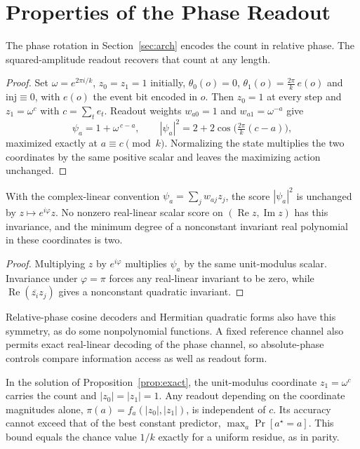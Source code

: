 \section{Properties of the Phase Readout}
\label{app:proofs}
The phase rotation in Section~\ref{sec:arch} encodes the count in relative
phase. The squared-amplitude readout recovers that count at any length.

\begin{proof}
Set $\omega = e^{2\pi i/k}$, $z_0=z_1=1$ initially, $\theta_0(o)=0$,
$\theta_1(o)=\tfrac{2\pi}{k}\,e(o)$ and $\mathrm{inj}\equiv 0$, with $e(o)$ the
event bit encoded in $o$. Then $z_0=1$ at every step and $z_1=\omega^{c}$ with
$c=\sum_t e_t$. Readout weights $w_{a0}=1$ and $w_{a1}=\omega^{-a}$ give
\begin{equation}
\psi_a = 1 + \omega^{\,c-a},\qquad
|\psi_a|^2 = 2 + 2\cos\!\Big(\tfrac{2\pi}{k}(c-a)\Big),
\label{eq:interference}
\end{equation}
maximized exactly at $a\equiv c \pmod{k}$. Normalizing the state multiplies the
two coordinates by the same positive scalar and leaves the maximizing action
unchanged.
\end{proof}


\begin{proposition}
\label{prop:gauge}
With the complex-linear convention $\psi_a=\sum_jw_{aj}z_j$, the score
$|\psi_a|^2$ is unchanged by $z\mapsto e^{i\varphi}z$.
No nonzero real-linear scalar score on $(\operatorname{Re}z,\operatorname{Im}z)$ has this
invariance, and the minimum degree of a nonconstant invariant real polynomial in these
coordinates is two.
\end{proposition}
\begin{proof}
Multiplying $z$ by $e^{i\varphi}$ multiplies $\psi_a$ by the same unit-modulus scalar.
Invariance under $\varphi=\pi$ forces any real-linear invariant to be zero, while
$\operatorname{Re}(\overline{z_i}z_j)$ gives a nonconstant quadratic invariant.
\end{proof}
Relative-phase cosine decoders and Hermitian quadratic forms also have this
symmetry, as do some nonpolynomial functions.
A fixed reference channel also permits exact real-linear decoding of the phase channel,
so absolute-phase controls compare information access as well as readout form.

\begin{lemma}
\label{lem:blind}
In the solution of Proposition~\ref{prop:exact}, the unit-modulus coordinate
$z_1=\omega^{c}$ carries the count and $|z_0|=|z_1|=1$. Any readout depending on the
coordinate magnitudes alone, $\pi(a)=f_a(|z_0|,|z_1|)$, is independent of $c$. Its accuracy
cannot exceed that of the best constant predictor, $\max_a \Pr[a^\star=a]$. This bound
equals the chance value $1/k$ exactly for a uniform residue, as in parity.
\end{lemma}

